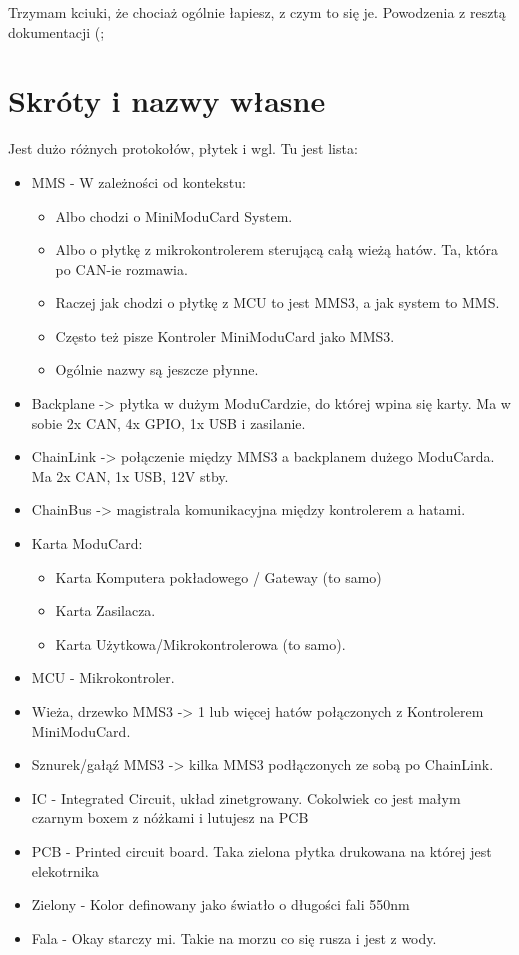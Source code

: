 \documentclass[b5paper, 10pt, twoside]{book}
\begin{document}
Trzymam kciuki, że chociaż ogólnie łapiesz, z czym to się je. Powodzenia z resztą dokumentacji (;



\chapter{Skróty i nazwy własne}
Jest dużo różnych protokołów, płytek i wgl. Tu jest lista:

\begin{itemize}
  \item MMS - W zależności od kontekstu:
        \begin{itemize}
          \item Albo chodzi o MiniModuCard System.
          \item Albo o płytkę z mikrokontrolerem sterującą całą wieżą hatów. Ta, która po CAN-ie rozmawia.
          \item Raczej jak chodzi o płytkę z MCU to jest MMS3, a jak system to MMS.
          \item Często też pisze Kontroler MiniModuCard jako MMS3.
          \item Ogólnie nazwy są jeszcze płynne.
        \end{itemize}
  \item Backplane -> płytka w dużym ModuCardzie, do której wpina się karty. Ma w sobie 2x CAN, 4x GPIO, 1x USB i zasilanie.
  \item ChainLink -> połączenie między MMS3 a backplanem dużego ModuCarda. Ma 2x CAN, 1x USB, 12V stby.
  \item ChainBus -> magistrala komunikacyjna między kontrolerem a hatami.
  \item Karta ModuCard:
        \begin{itemize}
          \item Karta Komputera pokładowego / Gateway (to samo)
          \item Karta Zasilacza.
          \item Karta Użytkowa/Mikrokontrolerowa (to samo).
        \end{itemize}
  \item MCU - Mikrokontroler.
  \item Wieża, drzewko MMS3 -> 1 lub więcej hatów połączonych z Kontrolerem MiniModuCard.
  \item Sznurek/gałąź MMS3 -> kilka MMS3 podłączonych ze sobą po ChainLink.
  \item IC - Integrated Circuit, układ zinetgrowany. Cokolwiek co jest małym czarnym boxem z nóżkami i lutujesz na PCB
  \item PCB - Printed circuit board. Taka zielona płytka drukowana na której jest elekotrnika
  \item Zielony - Kolor definowany jako światło o długości fali 550nm
  \item Fala - Okay starczy mi. Takie na morzu co się rusza i jest z wody.
\end{itemize}
\end{document}
